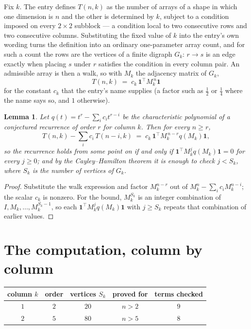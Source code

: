 \documentclass[11pt,a4paper]{article}
\theoremstyle{plain}
\newtheorem{lemma}[theorem]{Lemma}
\theoremstyle{definition}
\begin{document}
Fix $k$. The entry defines $T(n,k)$ as the number of arrays of a shape in which one dimension
is $n$ and the other is determined by $k$, subject to a condition imposed on every
$2\times2$ subblock --- a condition local to two consecutive rows and two consecutive columns.
Substituting the fixed value of $k$ into the entry's own wording turns the definition into an
ordinary one-parameter array count, and for such a count the rows are the vertices of a finite
digraph $G_k$: $r\to s$ is an edge exactly when placing $s$ under $r$ satisfies the condition
in every column pair. An admissible array is then a walk, so with $M_k$ the adjacency matrix
of $G_k$,
\[
T(n,k)\;=\;c_k\,\mathbf{1}^{\!\top}M_k^{\,n}\mathbf{1}
\]
for the constant $c_k$ that the entry's name supplies (a factor such as $\tfrac12$ or
$\tfrac14$ where the name says so, and $1$ otherwise).

\begin{lemma}\label{lem:crit}
Let $q(t)=t^{r}-\sum_i c_it^{r-i}$ be the characteristic polynomial of a conjectured
recurrence of order $r$ for column $k$. Then for every $n\ge r$,
\[
T(n,k)-\sum_i c_i\,T(n-i,k)\;=\;c_k\,\mathbf{1}^{\!\top}M_k^{\,n-r}q(M_k)\mathbf{1},
\]
so the recurrence holds from some point on if and only if
$\mathbf{1}^{\!\top}M_k^{j}q(M_k)\mathbf{1}=0$ for every $j\ge0$; and by the
Cayley--Hamilton theorem it is enough to check $j<S_k$, where $S_k$ is the number of vertices
of $G_k$.
\end{lemma}

\begin{proof}
Substitute the walk expression and factor $M_k^{n-r}$ out of $M_k^{n}-\sum_ic_iM_k^{n-i}$;
the scalar $c_k$ is nonzero. For the bound, $M_k^{S_k}$ is an integer combination of
$I,M_k,\dots,M_k^{S_k-1}$, so each $\mathbf{1}^{\!\top}M_k^{j}q(M_k)\mathbf{1}$ with
$j\ge S_k$ repeats that combination of earlier values.
\end{proof}

\section{The computation, column by column}

\begin{center}
\begin{tabular}{ccccc}
column $k$ & order & vertices $S_k$ & proved for & terms checked \\ \hline
$1$ & $2$ & $20$ & $n>2$ & $9$ \\
$2$ & $5$ & $80$ & $n>5$ & $8$ \\
\end{tabular}
\end{center}
\end{document}
